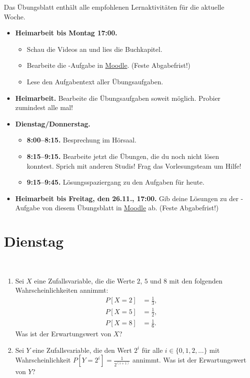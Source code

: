 \documentclass{uebung_cs}
\begin{document}
Das Übungsblatt enthält alle empfohlenen Lernaktivitäten für die aktuelle Woche.

\begin{itemize}
\item \textbf{Heimarbeit bis Montag 17:00.}
    \begin{itemize}
    \item 
    Schau die Videos an und lies die Buchkapitel.
    \item Bearbeite die -Aufgabe in \href{https://moodle.studiumdigitale.uni-frankfurt.de/moodle/course/view.php?id=2241}{Moodle}. (Feste Abgabefrist!)
    \item Lese den Aufgabentext aller Übungsaufgaben.
    \end{itemize}
\item \textbf{Heimarbeit.} Bearbeite die Übungsaufgaben soweit möglich. Probier zumindest alle mal!
\item \textbf{Dienstag/Donnerstag.}
\begin{itemize}
    \item \textbf{8:00--8:15.} Besprechung im Hörsaal.
    \item \textbf{8:15--9:15.} Bearbeite jetzt die Übungen, die du noch nicht lösen konntest. Sprich mit anderen Studis! Frag das Vorlesungsteam um Hilfe!
    \item \textbf{9:15--9:45.} Lösungsspaziergang zu den Aufgaben für heute.
\end{itemize}

\item \textbf{Heimarbeit bis Freitag, den 26.11., 17:00.} Gib deine Lösungen zu der -Aufgabe von diesem Übungsblatt in \href{https://moodle.studiumdigitale.uni-frankfurt.de/moodle/course/view.php?id=2241}{Moodle} ab. (Feste Abgabefrist!)
\end{itemize}

\section*{Dienstag}

\begin{aufgabe}[Erwartungswerte]\
	\begin{enumerate}
		\item Sei $X$ eine Zufallsvariable, die die Werte $2$, $5$ und $8$ mit den folgenden Wahrscheinlichkeiten annimmt:
		\begin{align*}
			P[X=2] &= \tfrac{1}{3},\\
			P[X=5] &= \tfrac{1}{2},\\
			P[X=8] &= \tfrac{1}{6}.
		\end{align*}
		Was ist der Erwartungswert von $X$?\\
		
		\item Sei $Y$ eine Zufallsvariable, die den Wert $2^i$ für alle $i \in \{0,1,2,\dots\}$ mit Wahrscheinlichkeit $P[Y=2^i] = \frac{1}{2^{(i+1)}}$ annimmt. Was ist der Erwartungswert von $Y$?
	\end{enumerate}	
\end{aufgabe}
\end{document}
